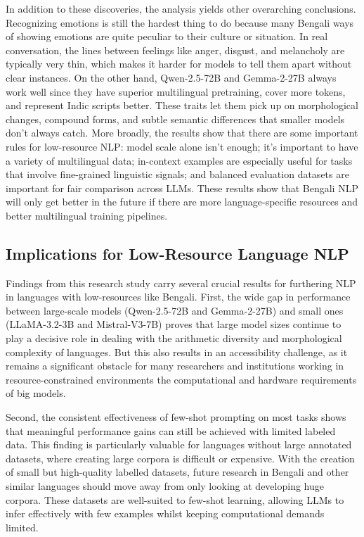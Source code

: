 \documentclass[10pt,letterpaper]{article}
\begin{document}
In addition to these discoveries, the analysis yields other overarching conclusions.  Recognizing emotions is still the hardest thing to do because many Bengali ways of showing emotions are quite peculiar to their culture or situation.  In real conversation, the lines between feelings like anger, disgust, and melancholy are typically very thin, which makes it harder for models to tell them apart without clear instances.  On the other hand, Qwen-2.5-72B and Gemma-2-27B always work well since they have superior multilingual pretraining, cover more tokens, and represent Indic scripts better.  These traits let them pick up on morphological changes, compound forms, and subtle semantic differences that smaller models don't always catch.  More broadly, the results show that there are some important rules for low-resource NLP: model scale alone isn't enough; it's important to have a variety of multilingual data; in-context examples are especially useful for tasks that involve fine-grained linguistic signals; and balanced evaluation datasets are important for fair comparison across LLMs.  These results show that Bengali NLP will only get better in the future if there are more language-specific resources and better multilingual training pipelines.



\subsection*{Implications for Low-Resource Language NLP}

Findings from this research study carry several crucial results for furthering NLP in languages with low-resources like Bengali. First, the wide gap in performance between large-scale models (Qwen-2.5-72B and Gemma-2-27B) and small ones (LLaMA-3.2-3B and Mistral-V3-7B) proves that large model sizes continue to play a decisive role in dealing with the arithmetic diversity and morphological complexity of languages. But this also results in an accessibility challenge, as it remains a significant obstacle for many researchers and institutions working in resource-constrained environments the computational and hardware requirements of big models.

Second, the consistent effectiveness of few-shot prompting on most tasks shows that meaningful performance gains can still be achieved with limited labeled data. This finding is particularly valuable for languages without large annotated datasets, where creating large corpora is difficult or expensive. With the creation of small but high-quality labelled datasets, future research in Bengali and other similar languages should move away from only looking at developing huge corpora. These datasets are well-suited to few-shot learning, allowing LLMs to infer effectively with few examples whilst keeping computational demands limited.
\end{document}
